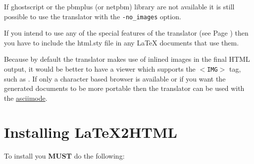 If {\fn ghostscript} or the {\fn pbmplus} (or {\fn netpbm}) library are not
available it
is still possible to
use the translator with the {\tt -no\_images} option. 

If you intend to use any of the special features of the translator (see Page \pageref{special})
then you have to include the 
{\fn html.sty} file in any LaTeX documents that use them. 

Because by default the translator makes use of inlined images in the final 
HTML output, it would be better to have a viewer which supports 
the {\tt $<$IMG$>$} tag, such as .
If only a character based browser is available or if you want the
generated
documents to be more portable then the translator can be used
with the 
\hyperref{{\tt -ascii$\_$mode} option}{{\tt -ascii$\_$mode} option (See
Section }{ )}{asciimode}. 

\section{Installing LaTeX2HTML}

To install \latextohtml you {\bf MUST} do the following:

